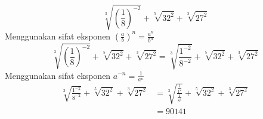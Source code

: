 \documentclass{article}
\begin{document}
\begin{enumerate}
\begin{minipage}[t]{\linewidth}
\[							\sqrt[3]{\left(\frac{1}{8}\right)^{-2}}+\sqrt[5]{32^{2}}+\sqrt[3]{27^{2}}
						\]
						Menggunakan sifat eksponen $\left(\frac{a}{b}\right)^{n}=\frac{a^{n}}{b^{n}}$
						\[
							\sqrt[3]{\left(\frac{1}{8}\right)^{-2}}+\sqrt[5]{32^{2}}+\sqrt[3]{27^{2}} =
							\sqrt[3]{\frac{1^{-2}}{8^{-2}}}+\sqrt[5]{32^{2}}+\sqrt[3]{27^{2}}	
						\]
						Menggunakan sifat eksponen $a^{-n}=\frac{1}{a^n}$
							\begin{align}
								\sqrt[3]{\frac{1^{-2}}{8^{-2}}}+\sqrt[5]{32^{2}}+\sqrt[3]{27^{2}} &= 
								\sqrt[3]{\frac{\frac{1}{1^{2}}}{\frac{1}{8^{2}}}}+\sqrt[5]{32^{2}}+\sqrt[3]{27^{2}}\\
								&=90141 \\
							\end{align}
						\end{minipage}
    
\end{enumerate}
\end{document}
